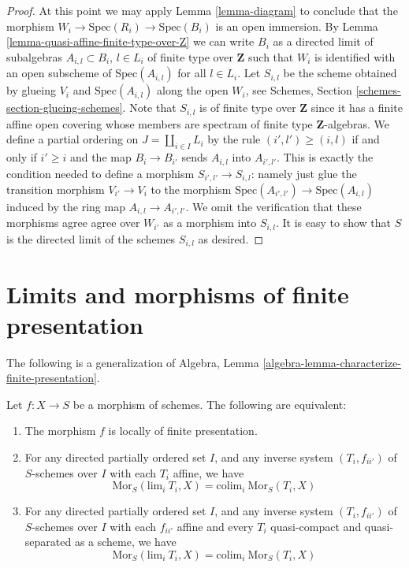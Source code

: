 \begin{proof}
\medskip\noindent
At this point we may apply Lemma \ref{lemma-diagram}
to conclude that the morphism
$W_i \to \text{Spec}(R_i) \to \text{Spec}(B_i)$
is an open immersion.
By Lemma \ref{lemma-quasi-affine-finite-type-over-Z}
we can write $B_i$ as a directed limit of subalgebras
$A_{i, l} \subset B_i$, $l \in L_i$
of finite type over $\mathbf{Z}$ such that $W_i$ is
identified with an open subscheme of $\text{Spec}(A_{i, l})$
for all $l \in L_i$.
Let $S_{i, l}$ be the scheme obtained by glueing
$V_i$ and $\text{Spec}(A_{i, l})$ along the open $W_i$, see
Schemes, Section \ref{schemes-section-glueing-schemes}.
Note that $S_{i, l}$ is of finite type over $\mathbf{Z}$ since
it has a finite affine open covering whose members are
spectram of finite type $\mathbf{Z}$-algebras.
We define a partial ordering on $J = \coprod_{i \in I} L_i$
by the rule $(i', l') \geq (i, l)$ if and only if
$i' \geq i$ and the map $B_i \to B_{i'}$ sends $A_{i, l}$ into
$A_{i', l'}$. This is exactly the condition needed to
define a morphism $S_{i', l'} \to S_{i, l}$: namely just glue
the transition morphism $V_{i'} \to V_i$ to the morphism
$\text{Spec}(A_{i', l'}) \to \text{Spec}(A_{i, l})$ induced
by the ring map $A_{i, l} \to A_{i', l'}$. We omit the verification
that these morphisms agree agree over $W_{i'}$ as a morphism
into $S_{i, l}$.
It is easy to show that $S$ is the directed limit
of the schemes $S_{i, l}$ as desired.
\end{proof}






\section{Limits and morphisms of finite presentation}
\label{section-finite-presentation}

\noindent
The following is a generalization of
Algebra, Lemma \ref{algebra-lemma-characterize-finite-presentation}.

\begin{proposition}
\label{proposition-characterize-locally-finite-presentation}
Let $f : X \to S$ be a morphism of schemes.
The following are equivalent:
\begin{enumerate}
\item The morphism $f$ is locally of finite presentation.
\item For any directed partially ordered set $I$, and any
inverse system $(T_i, f_{ii'})$ of $S$-schemes over $I$
with each $T_i$ affine, we have
$$
\text{Mor}_S(\text{lim}_i\ T_i, X) =
\text{colim}_i\ \text{Mor}_S(T_i, X)
$$
\item For any directed partially ordered set $I$, and any
inverse system $(T_i, f_{ii'})$ of $S$-schemes over $I$
with each $f_{ii'}$ affine and every $T_i$ quasi-compact and
quasi-separated as a scheme, we have
$$
\text{Mor}_S(\text{lim}_i\ T_i, X) =
\text{colim}_i\ \text{Mor}_S(T_i, X)
$$
\end{enumerate}
\end{proposition}

